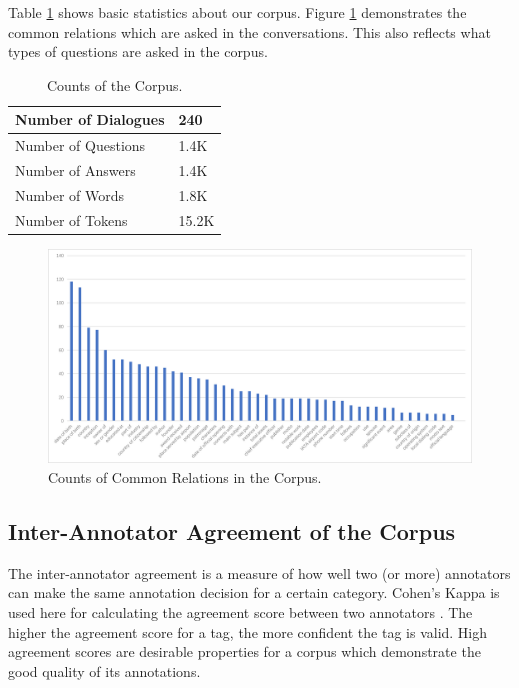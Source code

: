 \documentclass[bsc,frontabs,twoside,singlespacing,parskip,deptreport]{infthesis}     %
\begin{document}
Table \ref{tab:datacount} shows basic statistics about our corpus. Figure \ref{fig:relationcount} demonstrates the common relations which are asked in the conversations. This also reflects what types of questions are asked in the corpus.

\begin{table}[]
\centering
\begin{tabular}{|l|l|}
\hline
Number of Dialogues & 240   \\ \hline
Number of Questions & 1.4K  \\ \hline
Number of Answers   & 1.4K  \\ \hline
Number of Words     & 1.8K  \\ \hline
Number of Tokens    & 15.2K \\ \hline
\end{tabular}
\caption{Counts of the Corpus.}
\label{tab:datacount}
\end{table}



\begin{figure}[h]
    \centering
    \includegraphics[width=1.2\textwidth]{graph1.png}
    \caption{Counts of Common Relations in the Corpus.}
    \label{fig:relationcount}
\end{figure}



\subsection*{Inter-Annotator Agreement of the Corpus}

The inter-annotator agreement is a measure of how well two (or more) annotators can make the same annotation decision for a certain category. Cohen's Kappa is used here for calculating the agreement score between two annotators \cite{carletta1996assessing}. The higher the agreement score for a tag, the more confident the tag is valid. High agreement scores are desirable properties for a corpus which demonstrate the good quality of its annotations.
\end{document}
